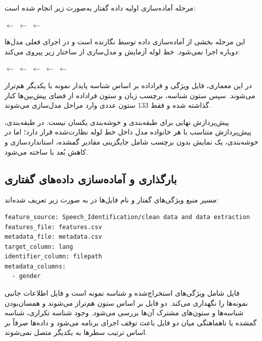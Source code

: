 \documentclass[12pt,a4paper,oneside]{report}
\begin{document}
مرحله آماده‌سازی اولیه داده گفتار به‌صورت زیر انجام شده است:

\begin{center}
$\longleftarrow$
$\longleftarrow$
$\longleftarrow$
\end{center}

این مرحله بخشی از آماده‌سازی داده توسط نگارنده است و در اجرای فعلی مدل‌ها دوباره اجرا نمی‌شود. خط لوله آزمایش و مدل‌سازی از ساختار زیر پیروی می‌کند:

\begin{center}
$\longleftarrow$
$\longleftarrow$
$\longleftarrow$
$\longleftarrow$
$\longleftarrow$
\end{center}

در این معماری، فایل ویژگی و فراداده بر اساس شناسه پایدار نمونه با یکدیگر هم‌تراز می‌شوند. سپس ستون شناسه، برچسب زبان و ستون فراداده از فضای پیش‌بین‌ها کنار گذاشته شده و فقط 133 ستون عددی وارد مراحل مدل‌سازی می‌شوند.

پیش‌پردازش نهایی برای طبقه‌بندی و خوشه‌بندی یکسان نیست. در طبقه‌بندی، پیش‌پردازش متناسب با هر خانواده مدل داخل خط لوله نظارت‌شده قرار دارد؛ اما در خوشه‌بندی، یک نمایش بدون برچسب شامل جایگزینی مقادیر گمشده، استانداردسازی و کاهش بُعد با
ساخته می‌شود.


\subsection{بارگذاری و آماده‌سازی داده‌های گفتاری}

مسیر منبع ویژگی‌های گفتار و نام فایل‌ها در
به صورت زیر تعریف شده‌اند:

\begin{latin}
\begin{verbatim}
feature_source: Speech_Identification/clean data and data extraction
features_file: features.csv
metadata_file: metadata.csv
target_column: lang
identifier_column: filepath
metadata_columns:
  - gender
\end{verbatim}
\end{latin}

فایل
شامل ویژگی‌های استخراج‌شده و شناسه نمونه است و فایل
اطلاعات جانبی نمونه‌ها را نگهداری می‌کند. دو فایل بر اساس ستون
هم‌تراز می‌شوند و همسان‌بودن شناسه‌ها و ستون‌های مشترک آن‌ها بررسی می‌شود. وجود شناسه تکراری، شناسه گمشده یا ناهماهنگی میان دو فایل باعث توقف اجرای برنامه می‌شود و داده‌ها صرفاً بر اساس ترتیب سطرها به یکدیگر متصل نمی‌شوند.
\end{document}
